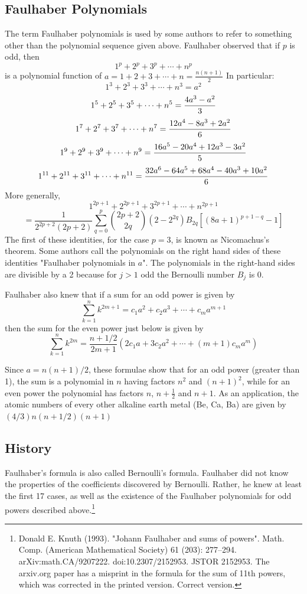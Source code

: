 \documentclass[10pt]{report}
\begin{document}
\subsection{Faulhaber Polynomials}
The term Faulhaber polynomials is used by some authors to refer to something other than the polynomial sequence given above. Faulhaber observed that if $p$ is odd, then
$$1^p + 2^p + 3^p + \cdots + n^p$$
is a polynomial function of
$a=1+2+3+\cdots+n= \frac{n(n+1)}{2}$ 
In particular:
$$1^3 + 2^3 + 3^3 + \cdots + n^3 = a^2$$
$$1^5 + 2^5 + 3^5 + \cdots + n^5 = {4a^3 - a^2 \over 3}$$
$$1^7 + 2^7 + 3^7 + \cdots + n^7 = {12a^4 -8a^3 + 2a^2 \over 6}$$
$$1^9 + 2^9 + 3^9 + \cdots + n^9 = {16a^5 - 20a^4 +12a^3 - 3a^2 \over 5}$$
$$1^{11} + 2^{11} + 3^{11} + \cdots + n^{11} = {32a^6 - 64a^5 + 68a^4 - 40a^3 + 10a^2 \over 6}$$
More generally,
$$1^{2p+1} + 2^{2p+1} + 3^{2p+1} + \cdots + n^{2p+1}$$
$$= \frac{1}{2^{2p+2}(2p+2)} \sum_{q=0}^p \binom{2p+2}{2q} (2-2^{2q}) B_{2q}\left[(8a+1)^{p+1-q}-1\right]$$
The first of these identities, for the case $p = 3$, is known as Nicomachus's theorem. Some authors call the polynomials on the right hand sides of these identities "Faulhaber polynomials in $a$". The polynomials in the right-hand sides are divisible by a 2 because for $j > 1$ odd the Bernoulli number $B_j$ is $0$.

Faulhaber also knew that if a sum for an odd power is given by
$$\sum_{k=1}^n k^{2m+1} = c_1 a^2 + c_2 a^3 + \cdots + c_m a^{m+1}$$
then the sum for the even power just below is given by
$$\sum_{k=1}^n k^{2m} = \frac{n+1/2}{2m+1}(2 c_1 a + 3 c_2 a^2+\cdots + (m+1) c_m a^m)$$

Since $a = n(n + 1)/2$, these formulae show that for an odd power (greater than 1), the sum is a polynomial in $n$ having factors $n^2$ and $(n + 1)^2$, while for an even power the polynomial has factors $n$, $n + \frac{1}{2}$ and $n + 1$. As an application, the atomic numbers of every other alkaline earth metal (Be, Ca, Ba) are given by $(4/3)n(n + 1/2)(n + 1)$
\subsection{History}
Faulhaber's formula is also called Bernoulli's formula. Faulhaber did not know the properties of the coefficients discovered by Bernoulli. Rather, he knew at least the first 17 cases, as well as the existence of the Faulhaber polynomials for odd powers described above.\footnote{Donald E. Knuth (1993). "Johann Faulhaber and sums of powers". Math. Comp. (American Mathematical Society) 61 (203): 277–294. arXiv:math.CA/9207222. doi:10.2307/2152953. JSTOR 2152953. The arxiv.org paper has a misprint in the formula for the sum of 11th powers, which was corrected in the printed version. Correct version.}
\end{document}

